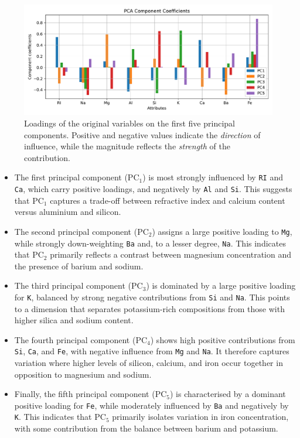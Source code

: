 \documentclass[dtu]{dtuarticle}
\begin{document}
	\begin{figure}
		\centering
		\includegraphics[width=.99\textwidth]{figures/pca_component_coefficients}
		\caption{Loadings of the original variables on the first five principal components. Positive and negative values indicate the \textit{direction} of influence, while the magnitude reflects the \textit{strength} of the contribution.}
		\label{fig:pc-components}
	\end{figure}

	\begin{itemize}
		\item The first principal component ($\text{PC}_1$) is most strongly influenced by \texttt{RI} and \texttt{Ca}, which carry positive loadings, and negatively by \texttt{Al} and \texttt{Si}. This suggests that $\text{PC}_1$ captures a trade-off between refractive index and calcium content versus aluminium and silicon.

		\item The second principal component ($\text{PC}_2$) assigns a large positive loading to \texttt{Mg}, while strongly down-weighting \texttt{Ba} and, to a lesser degree, \texttt{Na}. This indicates that $\text{PC}_2$ primarily reflects a contrast between magnesium concentration and the presence of barium and sodium.

		\item The third principal component ($\text{PC}_3$) is dominated by a large positive loading for \texttt{K}, balanced by strong negative contributions from \texttt{Si} and \texttt{Na}. This points to a dimension that separates potassium-rich compositions from those with higher silica and sodium content.

		\item The fourth principal component ($\text{PC}_4$) shows high positive contributions from \texttt{Si}, \texttt{Ca}, and \texttt{Fe}, with negative influence from \texttt{Mg} and \texttt{Na}. It therefore captures variation where higher levels of silicon, calcium, and iron occur together in opposition to magnesium and sodium.

		\item Finally, the fifth principal component ($\text{PC}_5$) is characterised by a dominant positive loading for \texttt{Fe}, while moderately influenced by \texttt{Ba} and negatively by \texttt{K}. This indicates that $\text{PC}_5$ primarily isolates variation in iron concentration, with some contribution from the balance between barium and potassium.
	\end{itemize}
\end{document}

